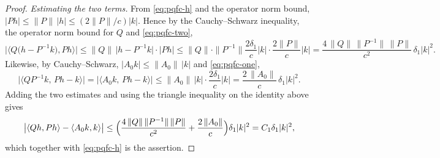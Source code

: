 \begin{proof}
\emph{Estimating the two terms.}
From \eqref{eq:pqfc-h} and the operator norm bound,
$|Ph|\le\|P\|\,|h|\le(2\|P\|/c)|k|$. Hence by the Cauchy--Schwarz inequality,
the operator norm bound for $Q$ and \eqref{eq:pqfc-two},
\[
  \bigl|\bigl\langle Q\bigl(h-P^{-1}k\bigr),Ph\bigr\rangle\bigr|
   \le\|Q\|\,\bigl|h-P^{-1}k\bigr|\cdot|Ph|
   \le\|Q\|\cdot\|P^{-1}\|\frac{2\delta_1}{c}|k|\cdot\frac{2\|P\|}{c}|k|
   =\frac{4\,\|Q\|\,\|P^{-1}\|\,\|P\|}{c^2}\,\delta_1|k|^2 .
\]
Likewise, by Cauchy--Schwarz, $|A_0k|\le\|A_0\|\,|k|$ and \eqref{eq:pqfc-one},
\[
  \bigl|\bigl\langle QP^{-1}k,\,Ph-k\bigr\rangle\bigr|
   =\bigl|\langle A_0k,\,Ph-k\rangle\bigr|
   \le\|A_0\|\,|k|\cdot\frac{2\delta_1}{c}|k|
   =\frac{2\,\|A_0\|}{c}\,\delta_1|k|^2 .
\]
Adding the two estimates and using the triangle inequality on the identity above
gives
\[
  \bigl|\langle Qh,Ph\rangle-\langle A_0k,k\rangle\bigr|
   \le\Bigl(\frac{4\,\|Q\|\,\|P^{-1}\|\,\|P\|}{c^2}+\frac{2\,\|A_0\|}{c}\Bigr)
      \delta_1|k|^2=C_1\delta_1|k|^2 ,
\]
which together with \eqref{eq:pqfc-h} is the assertion.
\end{proof}
